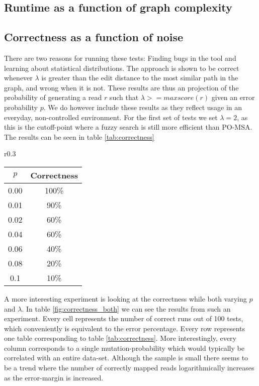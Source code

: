 \documentclass[thesis.tex]{subfiles}
\begin{document}
\subsection*{Runtime as a function of graph complexity}
\subsection*{Correctness as a function of noise}
There are two reasons for running these tests: Finding bugs in the tool and learning about statistical distributions. The approach is shown to be correct whenever $\lambda$ is greater than the edit distance to the most similar path in the graph, and wrong when it is not. These results are thus an projection of the probability of generating a read $r$ such that $\lambda>=maxscore(r)$ given an error probability $p$. We do however include these results as they reflect usage in an everyday, non-controlled environment. For the first set of tests we set $\lambda=2$, as this is the cutoff-point where a fuzzy search is still more efficient than PO-MSA. The results can be seen in table \ref{tab:correctness}
\begin{wraptable}{r}{0.3\textwidth}
  \begin{tabular}{|c|c|}
    \hline $p$ & \textbf{Correctness} \\ \hline
    0.00 & 100\% \\ \hline
    0.01 & 90\% \\ \hline
    0.02 & 60\% \\ \hline
    0.04 & 60\% \\ \hline
    0.06 & 40\% \\ \hline
    0.08 & 20\% \\ \hline
    0.1 & 10\% \\ \hline
  \end{tabular}
  \caption{Percentage of correctly aligned reads as $p$ varies and $\lambda$ is fixed}
  \label{tab:correctness}
\end{wraptable}
A more interesting experiment is looking at the correctness while both varying $p$ and $\lambda$. In table \ref{fig:correctness_both} we can see the results from such an experiment. Every cell represents the number of correct runs out of 100 tests, which conveniently is equivalent to the error percentage. Every row represents one table corresponding to table \ref{tab:correctness}. More interestingly, every column corresponds to a single mutation-probability which would typically be correlated with an entire data-set. Although the sample is small there seems to be a trend where the number of correctly mapped reads logarithmically increases as the error-margin is increased.
\end{document}
